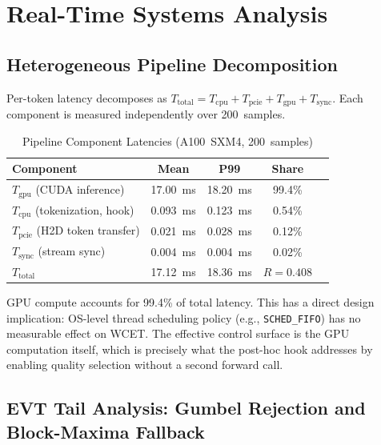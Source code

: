 \documentclass[conference]{IEEEtran}
\begin{document}
\section{Real-Time Systems Analysis}

\subsection{Heterogeneous Pipeline Decomposition}
\label{sec:pipeline}

Per-token latency decomposes as
$T_{\text{total}} = T_{\text{cpu}} + T_{\text{pcie}} +
T_{\text{gpu}} + T_{\text{sync}}$.
Each component is measured independently over 200~samples.

\begin{table}[htbp]
\caption{Pipeline Component Latencies (A100~SXM4, 200~samples)}
\centering
\setlength{\tabcolsep}{4pt}
\begin{tabular}{@{}lcccc@{}}
\toprule
\textbf{Component} & \textbf{Mean} & \textbf{P99} & \textbf{Share} \\
\midrule
$T_{\text{gpu}}$  (CUDA inference)     & 17.00~ms & 18.20~ms & 99.4\% \\
$T_{\text{cpu}}$  (tokenization, hook) & 0.093~ms & 0.123~ms &  0.54\% \\
$T_{\text{pcie}}$ (H2D token transfer) & 0.021~ms & 0.028~ms &  0.12\% \\
$T_{\text{sync}}$ (stream sync)        & 0.004~ms & 0.004~ms & 0.02\% \\
\midrule
$T_{\text{total}}$ & 17.12~ms & 18.36~ms & $R=0.408$ \\
\bottomrule
\end{tabular}
\label{tab:pipeline}
\end{table}

GPU compute accounts for 99.4\% of total latency.
This has a direct design implication: OS-level thread scheduling policy
(e.g., \texttt{SCHED\_FIFO}) has no measurable effect on WCET.
The effective control surface is the GPU computation itself, which is
precisely what the post-hoc hook addresses by enabling quality selection
without a second forward call.

\subsection{EVT Tail Analysis: Gumbel Rejection and Block-Maxima Fallback}
\label{sec:evt}
\end{document}
